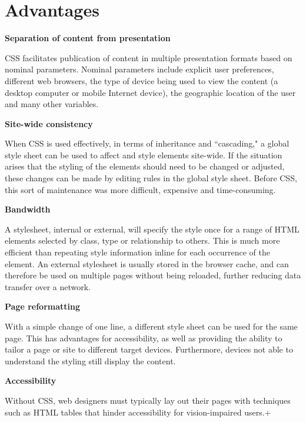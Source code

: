 \section{Advantages}

\begin{compactitem}
\item \textbf{Separation of content from presentation}

CSS facilitates publication of content in multiple presentation formats based on nominal parameters. Nominal parameters include explicit user preferences, different web browsers, the type of device being used to view the content (a desktop computer or mobile Internet device), the geographic location of the user and many other variables.


\item \textbf{Site-wide consistency}

When CSS is used effectively, in terms of inheritance and ``cascading," a global style sheet can be used to affect and style elements site-wide. If the situation arises that the styling of the elements should need to be changed or adjusted, these changes can be made by editing rules in the global style sheet. Before CSS, this sort of maintenance was more difficult, expensive and time-consuming.

\item \textbf{Bandwidth}

A stylesheet, internal or external, will specify the style once for a range of HTML elements selected by class, type or relationship to others. This is much more efficient than repeating style information inline for each occurrence of the element. An external stylesheet is usually stored in the browser cache, and can therefore be used on multiple pages without being reloaded, further reducing data transfer over a network.

\item \textbf{Page reformatting}

With a simple change of one line, a different style sheet can be used for the same page. This has advantages for accessibility, as well as providing the ability to tailor a page or site to different target devices. Furthermore, devices not able to understand the styling still display the content.

\item \textbf{Accessibility}

Without CSS, web designers must typically lay out their pages with techniques such as HTML tables that hinder accessibility for vision-impaired users.+
\end{compactitem}



